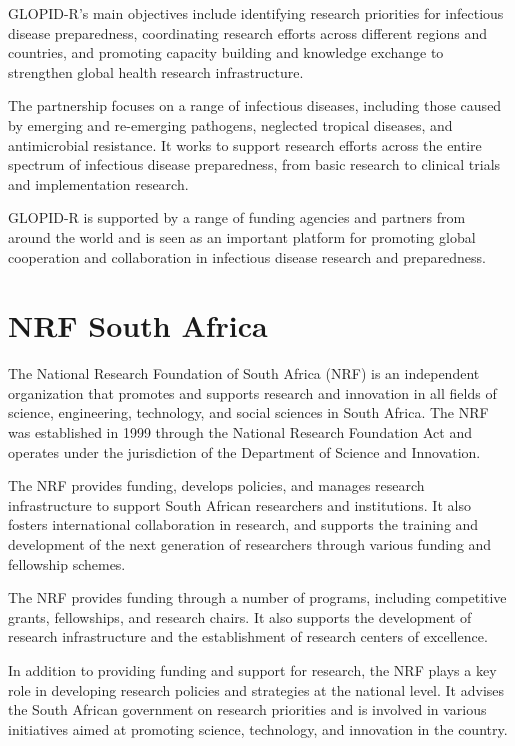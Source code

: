 \documentclass[
]{book}
\begin{document}
GLOPID-R's main objectives include identifying research priorities for infectious disease preparedness, coordinating research efforts across different regions and countries, and promoting capacity building and knowledge exchange to strengthen global health research infrastructure.

The partnership focuses on a range of infectious diseases, including those caused by emerging and re-emerging pathogens, neglected tropical diseases, and antimicrobial resistance. It works to support research efforts across the entire spectrum of infectious disease preparedness, from basic research to clinical trials and implementation research.

GLOPID-R is supported by a range of funding agencies and partners from around the world and is seen as an important platform for promoting global cooperation and collaboration in infectious disease research and preparedness.

\hypertarget{nrfza}{%
\section{NRF South Africa}\label{nrfza}}

The National Research Foundation of South Africa (NRF) is an independent organization that promotes and supports research and innovation in all fields of science, engineering, technology, and social sciences in South Africa. The NRF was established in 1999 through the National Research Foundation Act and operates under the jurisdiction of the Department of Science and Innovation.

The NRF provides funding, develops policies, and manages research infrastructure to support South African researchers and institutions. It also fosters international collaboration in research, and supports the training and development of the next generation of researchers through various funding and fellowship schemes.

The NRF provides funding through a number of programs, including competitive grants, fellowships, and research chairs. It also supports the development of research infrastructure and the establishment of research centers of excellence.

In addition to providing funding and support for research, the NRF plays a key role in developing research policies and strategies at the national level. It advises the South African government on research priorities and is involved in various initiatives aimed at promoting science, technology, and innovation in the country.
\end{document}
